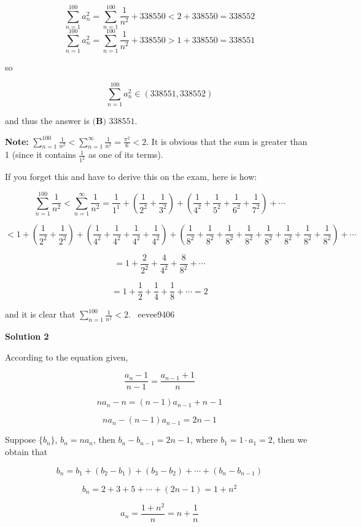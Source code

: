 \begin{enumerate}
 
 \[\sum^{100}_{n=1} a_n^2= \sum^{100}_{n=1} \frac{1}{n^2}+338550<2+338550=338552\]
 \[\sum^{100}_{n=1} a_n^2= \sum^{100}_{n=1} \frac{1}{n^2}+338550>1+338550=338551\]

 so

 
 \[\sum^{100}_{n=1} a_n^2\in(338551,338552)\]

 and thus the answer is $\boxed{\textbf{(B) }338551}$.

 \textbf{Note:} $\sum^{100}_{n=1} \frac{1}{n^2}< \sum^{\infty}_{n=1} \frac{1}{n^2}=\frac{\pi^2}{6}<2$. It is obvious that the sum is greater than 1 (since it contains $\frac{1}{1^2}$ as one of its terms).

 If you forget this and have to derive this on the exam, here is how:

 
 \[\sum^{100}_{n=1} \frac{1}{n^2}<\sum^{\infty}_{n=1} \frac{1}{n^2}=\frac{1}{1^1}+\left(\frac{1}{2^2}+\frac{1}{3^2}\right)+\left(\frac{1}{4^2}+\frac{1}{5^2}+\frac{1}{6^2}+\frac{1}{7^2}\right)+\cdots\]

 \[<1+\left(\frac{1}{2^2}+\frac{1}{2^2}\right)+\left(\frac{1}{4^2}+\frac{1}{4^2}+\frac{1}{4^2}+\frac{1}{4^2}\right)+\left(\frac{1}{8^2}+\frac{1}{8^2}+\frac{1}{8^2}+\frac{1}{8^2}+\frac{1}{8^2}+\frac{1}{8^2}+\frac{1}{8^2}+\frac{1}{8^2}\right)+\cdots\]

 \[=1+\frac{2}{2^2}+\frac{4}{4^2}+\frac{8}{8^2}+\cdots\]

 \[=1+\frac{1}{2}+\frac{1}{4}+\frac{1}{8}+\cdots=2\]

 and it is clear that $\sum^{100}_{n=1} \frac{1}{n^2}<2$. ~eevee9406

 


 



\textbf{Solution 2}

According to the equation given,

 
 \[\frac{a_n - 1}{n - 1} = \frac{a_{n - 1} + 1}{n}\]

 \[na_n - n = (n - 1)a_{n - 1} + n - 1\]

 \[na_n - (n - 1)a_{n - 1} = 2n - 1\]

 Suppose $\{b_n\}$, $b_n = na_n$, then $b_n - b_{n - 1} = 2n - 1$, where $b_1 = 1 \cdot a_1 = 2$, then we obtain that

 
 \[b_n = b_1 + (b_2 - b_1) + (b_3 - b_2) + \cdots + (b_n - b_{n - 1})\]

 \[b_n = 2 + 3 + 5 + \cdots + (2n - 1) = 1 + n^2\]

 \[a_n = \frac{1 + n^2}{n} = n + \frac{1}{n}\]


\end{enumerate}

